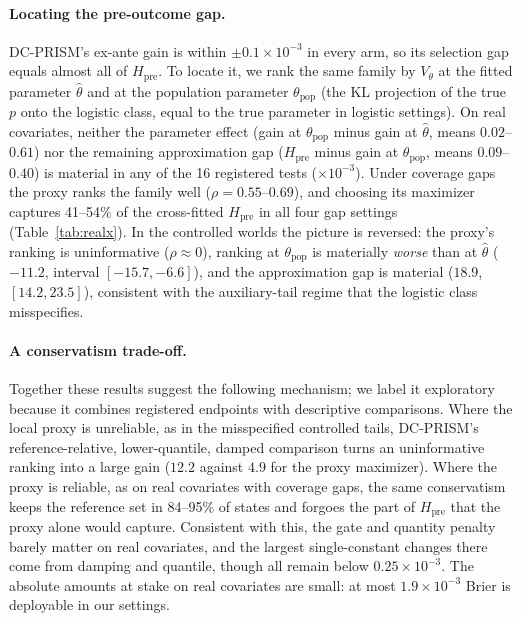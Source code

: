\documentclass[runningheads]{llncs}
\begin{document}
\paragraph{Locating the pre-outcome gap.} DC-PRISM's ex-ante gain is within $\pm0.1\times10^{-3}$ in every arm, so its selection gap equals almost all of $H_{\mathrm{pre}}$. To locate it, we rank the same family by $V_\theta$ at the fitted parameter $\widehat\theta$ and at the population parameter $\theta_{\mathrm{pop}}$ (the KL projection of the true $p$ onto the logistic class, equal to the true parameter in logistic settings). On real covariates, neither the parameter effect (gain at $\theta_{\mathrm{pop}}$ minus gain at $\widehat\theta$, means $0.02$--$0.61$) nor the remaining approximation gap ($H_{\mathrm{pre}}$ minus gain at $\theta_{\mathrm{pop}}$, means $0.09$--$0.40$) is material in any of the 16 registered tests ($\times10^{-3}$). Under coverage gaps the proxy ranks the family well ($\rho=0.55$--$0.69$), and choosing its maximizer captures 41--54\% of the cross-fitted $H_{\mathrm{pre}}$ in all four gap settings (Table~\ref{tab:realx}). In the controlled worlds the picture is reversed: the proxy's ranking is uninformative ($\rho\approx0$), ranking at $\theta_{\mathrm{pop}}$ is materially \emph{worse} than at $\widehat\theta$ ($-11.2$, interval $[-15.7,-6.6]$), and the approximation gap is material ($18.9$, $[14.2,23.5]$), consistent with the auxiliary-tail regime that the logistic class misspecifies.

\paragraph{A conservatism trade-off.} Together these results suggest the following mechanism; we label it exploratory because it combines registered endpoints with descriptive comparisons. Where the local proxy is unreliable, as in the misspecified controlled tails, DC-PRISM's reference-relative, lower-quantile, damped comparison turns an uninformative ranking into a large gain ($12.2$ against $4.9$ for the proxy maximizer). Where the proxy is reliable, as on real covariates with coverage gaps, the same conservatism keeps the reference set in 84--95\% of states and forgoes the part of $H_{\mathrm{pre}}$ that the proxy alone would capture. Consistent with this, the gate and quantity penalty barely matter on real covariates, and the largest single-constant changes there come from damping and quantile, though all remain below $0.25\times10^{-3}$. The absolute amounts at stake on real covariates are small: at most $1.9\times10^{-3}$ Brier is deployable in our settings.
\end{document}
